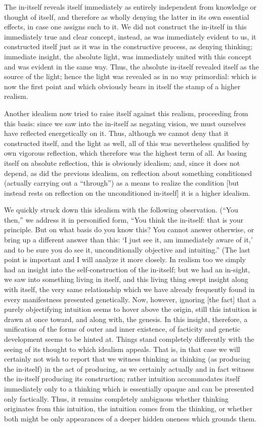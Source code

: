 The in-itself reveals itself immediately
as entirely independent from knowledge or thought of itself,
and therefore as wholly denying the latter
in its own essential effects, in case one assigns such to it.
We did not construct the in-itself
in this immediately true and clear concept,
instead, as was immediately evident to us,
it constructed itself just as it was
in the constructive process, as denying thinking;
immediate insight, the absolute light, was
immediately united with this concept
and was evident in the same way.
Thus, the absolute in-itself revealed itself
as the source of the light;
hence the light was revealed
as in no way primordial:
which is now the first point
and which obviously bears in itself
the stamp of a higher realism.

Another idealism now tried to raise itself
against this realism, proceeding from this basis:
since we saw into the in-itself as negating vision,
we must ourselves have reflected energetically on it.
Thus, although we cannot deny that it constructed itself,
and the light as well, all of this was nevertheless
qualified by own vigorous reflection,
which therefore was the highest term of all.
As basing itself on absolute reflection,
this is obviously idealism;
and, since it does not depend,
as did the previous idealism,
on reflection about something conditioned
(actually carrying out a “through”)
as a means to realize the condition
[but instead rests on reflection
on the unconditioned in-itself]
it is a higher idealism.

We quickly struck down this idealism
with the following observation.
(“You then,” we address it in personified form,
“You think the in-itself: that is your principle.
But on what basis do you know this?
You cannot answer otherwise,
or bring up a different answer than this:
‘I just see it, am immediately aware of it,’
and to be sure you do see it,
unconditionally objective and intuiting.”
(The last point is important and I will analyze it more closely.
In realism too we simply had an insight
into the self-construction of the in-itself;
but we had an in-sight, we saw into something living in itself,
and this living thing swept insight along with itself,
the very same relationship which we have already frequently found
in every manifestness presented genetically.
Now, however, ignoring [the fact] that
a purely objectifying intuition seems
to hover above the origin,
still this intuition is drawn at once toward,
and along with, the genesis.
In this insight, therefore,
a unification of the forms
of outer and inner existence,
of facticity and genetic development
seems to be hinted at.
Things stand completely differently with the seeing of
its thought to which idealism appeals.
That is, in that case we will certainly
not wish to report that we witness thinking as thinking
(as producing the in-itself)
in the act of producing, as we certainly actually and in fact witness
the in-itself producing its construction;
rather intuition accommodates itself immediately only to
a thinking which is essentially opaque
and can be presented only factically.
Thus, it remains completely ambiguous
whether thinking originates from this intuition,
the intuition comes from the thinking,
or whether both might be only appearances
of a deeper hidden oneness which grounds them.

